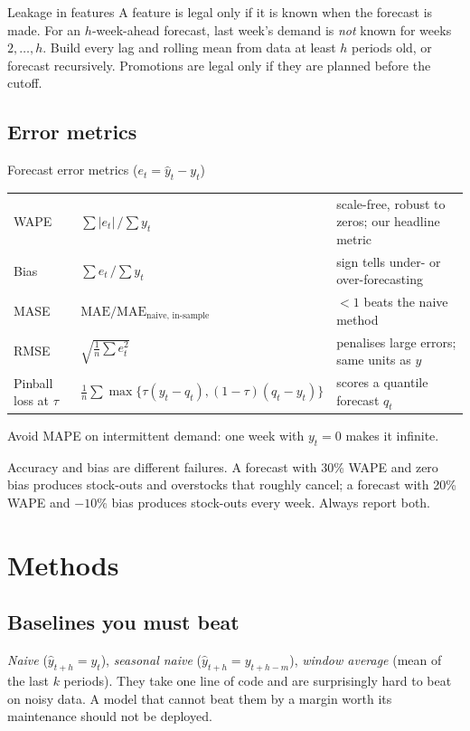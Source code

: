 \begin{pitfall}{Leakage in features}
A feature is legal only if it is known when the forecast is made. For an $h$-week-ahead forecast, last week's demand
is \emph{not} known for weeks $2,\dots,h$. Build every lag and rolling mean from data at least $h$ periods old, or
forecast recursively. Promotions are legal only if they are planned before the cutoff.
\end{pitfall}

\subsection{Error metrics}
\begin{keyformula}{Forecast error metrics ($e_t=\hat y_t-y_t$)}
\begin{tabular}{@{}L{3.6cm}L{5.2cm}L{4.6cm}@{}}
WAPE & $\sum|e_t|\,/\sum y_t$ & scale-free, robust to zeros; our headline metric\\
Bias & $\sum e_t\,/\sum y_t$ & sign tells under- or over-forecasting\\
MASE & $\mathrm{MAE}/\mathrm{MAE}_{\text{naive, in-sample}}$ & $<1$ beats the naive method\\
RMSE & $\sqrt{\tfrac1n\sum e_t^2}$ & penalises large errors; same units as $y$\\
Pinball loss at $\tau$ & $\tfrac1n\sum \max\{\tau(y_t-q_t),(1-\tau)(q_t-y_t)\}$ & scores a quantile forecast $q_t$\\
\end{tabular}
\smallskip
Avoid MAPE on intermittent demand: one week with $y_t=0$ makes it infinite.
\end{keyformula}

Accuracy and bias are different failures. A forecast with 30\% WAPE and zero bias produces stock-outs and overstocks
that roughly cancel; a forecast with 20\% WAPE and $-10\%$ bias produces stock-outs every week. Always report both.

\section{Methods}
\subsection{Baselines you must beat}
\emph{Naive} ($\hat y_{t+h}=y_t$), \emph{seasonal naive} ($\hat y_{t+h}=y_{t+h-m}$), \emph{window average} (mean of the last
$k$ periods). They take one line of code and are surprisingly hard to beat on noisy data. A model that cannot beat
them by a margin worth its maintenance should not be deployed.

